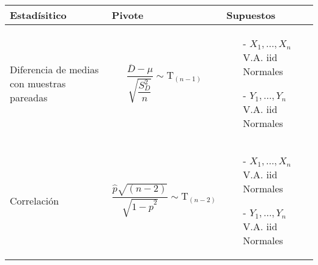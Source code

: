 \documentclass[pdftex,11pt,a4paper]{article}
\begin{document}
\setlength{\tabcolsep}{12pt}
\begin{tabular}{m{3.5cm} m{7.3cm} m{6.5cm}}
\textbf{Estadísitico} & \textbf{Pivote} & \textbf{Supuestos}\\ 
\hline 
\hline 

Diferencia de medias con muestras pareadas & 
$$\dfrac{\overline{D} - \mu}{\sqrt{\dfrac{S^2_D}{n}}} \sim \text{T}_{\left(n-1\right)}$$ &
\begin{itemize}
\item[-] $X_1,\ldots, X_n$ V.A. iid Normales
\item[-] $Y_1,\ldots, Y_n$ V.A. iid Normales
\end{itemize}\\ 
\hline

Correlación& 
$$\dfrac{\hat{p}\sqrt{\left(n-2\right)}}{\sqrt{1-\hat{p}^2}} \sim \text{T}_{\left(n-2\right)}$$ &
\begin{itemize}
\item[-] $X_1,\ldots, X_n$ V.A. iid Normales
\item[-] $Y_1,\ldots, Y_n$ V.A. iid Normales
\end{itemize}\\ 

\end{tabular} 
\end{document}
